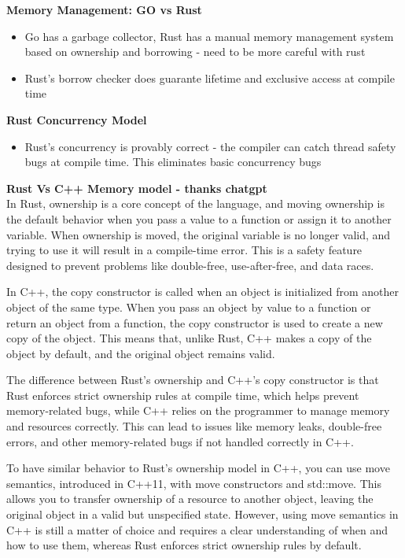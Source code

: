 \documentclass[10pt, landscape]{article}
\begin{document}
\begin{multicols}{4}
\textbf{Memory Management: GO vs Rust} \\
\begin{itemize}
    \item Go has a garbage collector, Rust has a manual memory management system based on ownership and borrowing - need to be more careful with rust 
    \item Rust's borrow checker does guarante lifetime and exclusive access at compile time
\end{itemize}

\textbf{Rust Concurrency Model} \\
\begin{itemize}
    \item Rust's concurrency is provably correct - the compiler can catch thread safety bugs at compile time. This eliminates basic concurrency bugs
\end{itemize}

\textbf{Rust Vs C++ Memory model - thanks chatgpt} \\
In Rust, ownership is a core concept of the language, and moving ownership is the default behavior when you pass a value to a function or assign it to another variable. When ownership is moved, the original variable is no longer valid, and trying to use it will result in a compile-time error. This is a safety feature designed to prevent problems like double-free, use-after-free, and data races.

In C++, the copy constructor is called when an object is initialized from another object of the same type. When you pass an object by value to a function or return an object from a function, the copy constructor is used to create a new copy of the object. This means that, unlike Rust, C++ makes a copy of the object by default, and the original object remains valid.

The difference between Rust's ownership and C++'s copy constructor is that Rust enforces strict ownership rules at compile time, which helps prevent memory-related bugs, while C++ relies on the programmer to manage memory and resources correctly. This can lead to issues like memory leaks, double-free errors, and other memory-related bugs if not handled correctly in C++.

To have similar behavior to Rust's ownership model in C++, you can use move semantics, introduced in C++11, with move constructors and std::move. This allows you to transfer ownership of a resource to another object, leaving the original object in a valid but unspecified state. However, using move semantics in C++ is still a matter of choice and requires a clear understanding of when and how to use them, whereas Rust enforces strict ownership rules by default.


\end{multicols}
\end{document}
